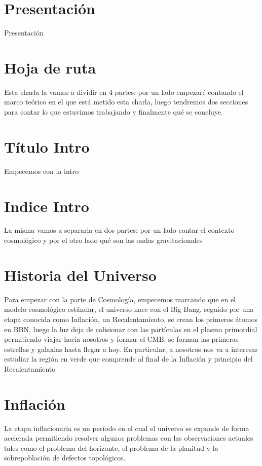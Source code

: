 \documentclass[letterpaper,12pt]{report}
\begin{document}
  \section{Presentación}
    Presentación

  \section{Hoja de ruta}
    Esta charla la vamos a dividir en 4 partes: por un lado empezaré contando el marco teórico en el que está metido esta charla, luego tendremos dos secciones para contar lo que estuvimos trabajando y finalmente qué se concluye.

  \section{Título Intro}
    Empecemos con la intro

  \section*{Indice Intro}
    La misma vamos a separarla en dos partes: por un lado contar el contexto cosmológico y por el otro lado qué son las ondas gravitacionales
  
  \section{Historia del Universo}
    Para empezar con la parte de Cosmología, empecemos marcando que en el modelo cosmológico estándar, el universo nace con el Big Bang, seguido por una etapa conocida como Inflación, un Recalentamiento, se crean los primeros átomos en BBN, luego la luz deja de colisionar con las partículas en el plasma primordial permitiendo viajar hacia nosotros y formar el CMB, se forman las primeras estrellas y galaxias hasta llegar a hoy. En particular, a nosotros nos va a interesar estudiar la región en verde que comprende al final de la Inflación y principio del Recalentamiento
  
  \section{Inflación} 
    La etapa inflacionaria es un período en el cual el universo se expande de forma acelerada permitiendo resolver algunos problemas con las observaciones actuales tales como el problema del horizonte, el problema de la planitud y la sobrepoblación de defectos topológicos.
\end{document}
